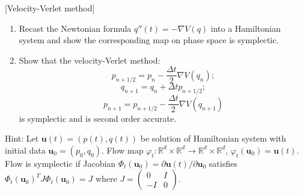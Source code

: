 \begin{exercise}
\label{applied:2018:2}
[Velocity-Verlet method]

\begin{enumerate}
\item[(a)] Recast the Newtonian formula $q''(t)=-\nabla V(q)$ into a Hamiltonian system and show the corresponding map on phase space is symplectic.
\item[(b)] Show that the velocity-Verlet method:
\[
p_{n+1/2}=p_{n}-\frac{\Delta t}{2}\nabla V(q_{n});
\]
\[
q_{n+1}=q_{n}+\Delta tp_{n+1/2};
\]
\[
p_{n+1}=p_{n+1/2}-\frac{\Delta t}{2}\nabla V(q_{n+1})
\]
is symplectic and is second order accurate.
\end{enumerate}

Hint: Let $\mathbf{u}(t)=(p(t),q(t))$ be solution of Hamiltonian system with initial data $\mathbf{u}_{0}=(p_{0},q_{0})$. Flow map $\varphi_{t}:\mathbb{R}^{d}\times\mathbb{R}^{d}\to\mathbb{R}^{d}\times\mathbb{R}^{d}$, $\varphi_{t}(\mathbf{u}_{0})=\mathbf{u}(t)$. Flow is symplectic if Jacobian $\Phi_{t}(\mathbf{u}_{0})=\partial\mathbf{u}(t)/\partial\mathbf{u}_{0}$ satisfies $\Phi_{t}(\mathbf{u}_{0})^{T}J\Phi_{t}(\mathbf{u}_{0})=J$ where $J=\begin{pmatrix}0&I\\-I&0\end{pmatrix}$.
\end{exercise}

